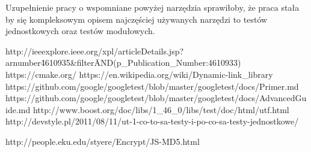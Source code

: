 \documentclass[12pt,a4paper,notitlepage]{report}
\begin{document}
	Uzupełnienie pracy o wspomniane powyżej narzędzia sprawiłoby, że praca stała by się kompleksowym opisem najczęściej używanych narzędzi to testów jednostkowych oraz testów modułowych.


	\begin{thebibliography}{1}
		 http://ieeexplore.ieee.org/xpl/articleDetails.jsp?arnumber\=4610935\&filter\=AND(p{\_}Publication{\_}Number:4610933)
		 https://cmake.org/
		 https://en.wikipedia.org/wiki/Dynamic-link{\_}library
	  	 https://github.com/google/googletest/blob/master/googletest/docs/Primer.md
	  	 https://github.com/google/googletest/blob/master/googletest/docs/AdvancedGuide.md
	  	 http://www.boost.org/doc/libs/1{\_}46{\_}0/libs/test/doc/html/utf.html
	  	 http://devstyle.pl/2011/08/11/ut-1-co-to-sa-testy-i-po-co-sa-testy-jednostkowe/

	  	 http://people.eku.edu/styere/Encrypt/JS-MD5.html
	 \end{thebibliography}
\end{document}

